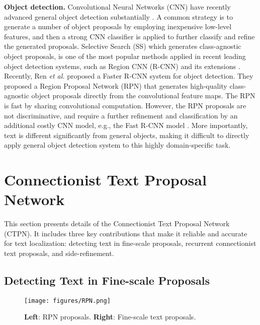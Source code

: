 \documentclass[runningheads]{llncs}
\begin{document}

\textbf{Object detection.}  Convolutional Neural Networks (CNN) have recently advanced general object detection substantially \cite{Ren2015,Girshick2015,Girshick2014}. A common strategy is to generate a number of  object proposals by employing inexpensive  low-level features, and then a strong CNN classifier is applied to further classify and refine the generated proposals. Selective Search (SS) \cite{Everingham2010} which  generates class-agnostic object proposals,  is one of the most popular methods applied in recent leading object detection systems, such as Region CNN (R-CNN) \cite{Girshick2014} and its extensions \cite{Girshick2015}. Recently, Ren \textit{et al.} \cite{Ren2015} proposed a Faster R-CNN system for object detection. They proposed a Region Proposal Network (RPN) that generates  high-quality class-agnostic object proposals  directly from the convolutional feature maps. The RPN is fast by sharing convolutional computation. However, the RPN proposals are not discriminative, and require a further refinement and classification by an additional costly CNN model, e.g., the Fast R-CNN model \cite{Girshick2015}. More importantly,  text is different significantly from general objects, making it difficult to directly apply general object detection system to this highly domain-specific task.





\section{Connectionist Text Proposal Network}
This section presents  details of the Connectionist Text Proposal Network (CTPN). It includes three key contributions that make it reliable and accurate for text localization: detecting text in fine-scale proposals,  recurrent connectionist text proposals, and  side-refinement. 

\subsection{Detecting Text in Fine-scale Proposals}
 \begin{figure}[tb]
\centering
\texttt{[image: figures/RPN.png]}
\caption{\textbf{Left}: RPN proposals. \textbf{Right}: Fine-scale text proposals.}
\label{fig:RPN}
\end{figure}
\end{document}
